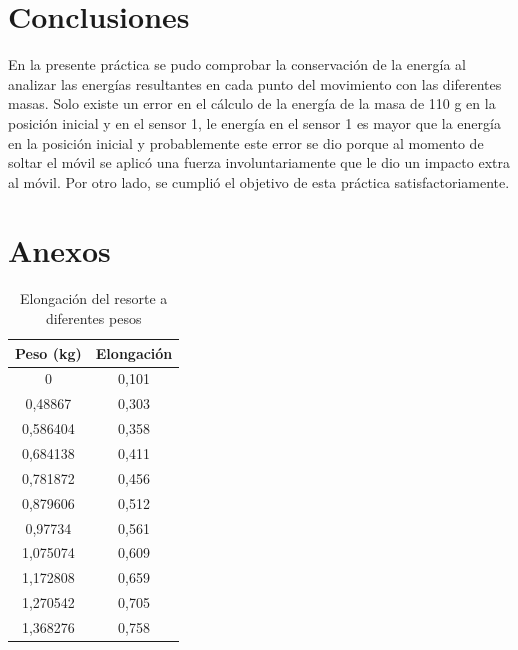 \documentclass[a4paper]{article}
\begin{document}
\section{Conclusiones}

En la presente práctica se pudo comprobar la conservación de la energía al analizar las energías resultantes en cada punto del movimiento con las diferentes masas. Solo existe un error en el cálculo de la energía de la masa de 110 g en la posición inicial y en el sensor 1, le energía en el sensor 1 es mayor que la energía en la posición inicial y probablemente este error se dio porque al momento de soltar el móvil se aplicó una fuerza involuntariamente que le dio un impacto extra al móvil. Por otro lado, se cumplió el objetivo de esta práctica satisfactoriamente. 

\section{Anexos}

\begin{table}[H]
    \centering
    \begin{tabular}{|c|c|}
    \hline
        Peso (kg) & Elongación  \\ \hline
        0 & 0,101  \\ \hline
        0,48867 & 0,303  \\ \hline
        0,586404 & 0,358  \\ \hline
        0,684138 & 0,411  \\ \hline
        0,781872 & 0,456  \\ \hline
        0,879606 & 0,512  \\ \hline
        0,97734 & 0,561  \\ \hline
        1,075074 & 0,609  \\ \hline
        1,172808 & 0,659  \\ \hline
        1,270542 & 0,705  \\ \hline
        1,368276 & 0,758  \\ \hline
    \end{tabular}
    \caption{Elongación del resorte a diferentes pesos}
    \label{Elongación del resorte a diferentes pesos}
\end{table}
\end{document}
